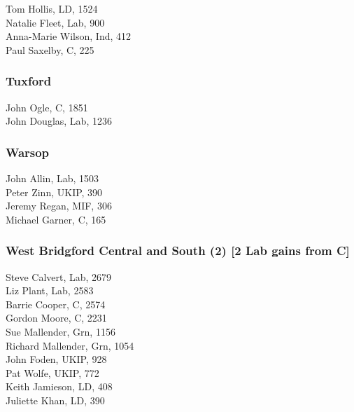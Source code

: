 \documentclass[a4paper,openany,10pt]{book}
\begin{document}


Tom Hollis, LD, 1524\\
Natalie Fleet, Lab, 900\\
Anna-Marie Wilson, Ind, 412\\
Paul Saxelby, C, 225\\


\subsubsection*{Tuxford}



John Ogle, C, 1851\\
John Douglas, Lab, 1236\\


\subsubsection*{Warsop}



John Allin, Lab, 1503\\
Peter Zinn, UKIP, 390\\
Jeremy Regan, MIF, 306\\
Michael Garner, C, 165\\


\subsubsection*{West Bridgford Central and South (2) \hspace*{\fill}\nolinebreak[1]%
\enspace\hspace*{\fill}
[2 Lab gains from C]}



Steve Calvert, Lab, 2679\\
Liz Plant, Lab, 2583\\
Barrie Cooper, C, 2574\\
Gordon Moore, C, 2231\\
Sue Mallender, Grn, 1156\\
Richard Mallender, Grn, 1054\\
John Foden, UKIP, 928\\
Pat Wolfe, UKIP, 772\\
Keith Jamieson, LD, 408\\
Juliette Khan, LD, 390\\
\end{document}
